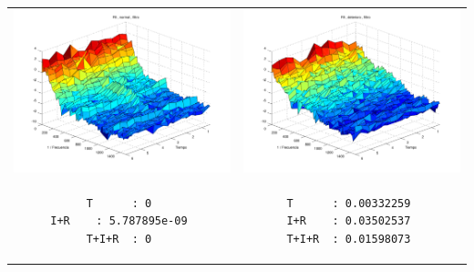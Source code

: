 \begin{tabular}{cc}
\includegraphics[width=0.5\linewidth]{n8f.pdf} 
&
\includegraphics[width=0.5\linewidth]{d8f.pdf} 
\\
\begin{lstlisting}
T      : 0 
I+R    : 5.787895e-09 
T+I+R  : 0 
\end{lstlisting}
&
\begin{lstlisting}
T      : 0.00332259 
I+R    : 0.03502537 
T+I+R  : 0.01598073 
\end{lstlisting}
\end{tabular}

